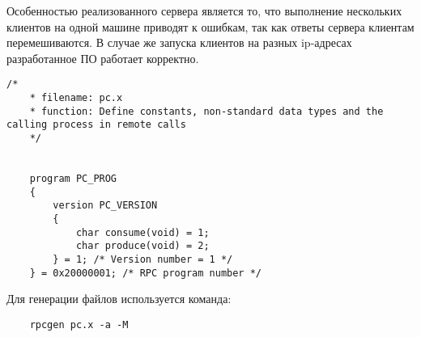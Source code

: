 
Особенностью реализованного сервера является то, что выполнение нескольких клиентов на одной машине приводят к ошибкам, так как ответы сервера клиентам перемешиваются. В случае же запуска клиентов на разных ip-адресах разработанное ПО работает корректно.

\begin{lstlisting}[caption={<<Файл pc.x для генерации сервера и скелетонов>>}]
	/*
	* filename: pc.x
	* function: Define constants, non-standard data types and the calling process in remote calls
	*/
	
	
	program PC_PROG
	{
		version PC_VERSION
		{
			char consume(void) = 1;
			char produce(void) = 2;
		} = 1; /* Version number = 1 */
	} = 0x20000001; /* RPC program number */
\end{lstlisting}

Для генерации файлов используется команда:

\begin{lstlisting}
	rpcgen pc.x -a -M
\end{lstlisting}

